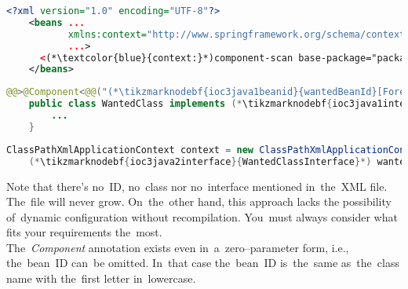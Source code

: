 \example
\begin{lstlisting}[language=XML, title={Configuration XML}]
    <?xml version="1.0" encoding="UTF-8"?>
    <beans ...
           xmlns:context="http://www.springframework.org/schema/context"
           ...>
      <(*\textcolor{blue}{context:}*)component-scan base-package="package.subfolder"/>
    </beans>
\end{lstlisting}
\begin{lstlisting}[language=Java, title={Wanted class}]
    @@>@Component<@@("(*\tikzmarknodebf{ioc3java1beanid}{wantedBeanId}[ForestGreen]*)")
    public class WantedClass implements (*\tikzmarknodebf{ioc3java1interface}{WantedClassInterface}*) {
        ...
    }
\end{lstlisting}
\begin{lstlisting}[language=Java, title={Usage}]
    ClassPathXmlApplicationContext context = new ClassPathXmlApplicationContext("configurationFile.xml");
    (*\tikzmarknodebf{ioc3java2interface}{WantedClassInterface}*) wantedClassInstance = context.getBean("(*\tikzmarknodebf{ioc3java2beanid}{wantedBeanId}[ForestGreen]*)", (*\tikzmarknodebf{ioc3java2interface2}{WantedClassInterface}*).class);
\end{lstlisting}

\noindent Note that there's no~ID, no~class nor no~interface mentioned in~the~XML file. The~file will never grow. On~the~other hand, this approach  lacks the possibility of~dynamic configuration without recompilation. You~must always consider what fits your requirements the~most.\\

\noindent The~\textit{Component} annotation exists even in~a~zero--parameter form, i.e., the~bean~ID can~be omitted. In~that case the~bean~ID is~the~same as~the~class name with the~first letter in~lowercase.
\newpage

